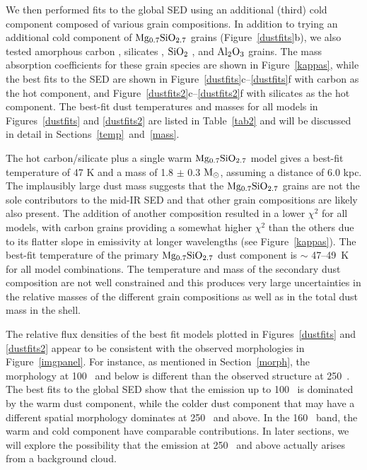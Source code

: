 \documentclass{emulateapj}
\begin{document}
We then performed fits to the global SED using an additional (third) cold component composed of various grain compositions. In addition to trying an additional cold component of $\rm Mg_{0.7}SiO_{2.7}$ grains (Figure~\ref{dustfits}b), we also tested amorphous carbon \citep{rouleau91},  silicates \citep{weingartner01}, $\rm SiO_2$ \citep{henning97}, and $\rm Al_2O_3$  \citep{begemann97} grains. The mass absorption coefficients for these grain species are shown in Figure~\ref{kappas}, while the best fits to the SED are shown in Figure~\ref{dustfits}c--\ref{dustfits}f with carbon as the hot component, and Figure~\ref{dustfits2}c--\ref{dustfits2}f with silicates as the hot component. The best-fit dust temperatures and masses for all models in Figures~\ref{dustfits} and \ref{dustfits2} are listed in Table~\ref{tab2} and will be discussed in detail in Sections~\ref{temp}~and~\ref{mass}.

The hot carbon/silicate plus a single warm $\rm Mg_{0.7}SiO_{2.7}$ model gives a best-fit temperature of 47 K and a mass of 1.8 $\pm$ 0.3 $\rm M_{\odot}$, assuming a distance of 6.0 kpc. The implausibly large dust mass suggests that the $\rm Mg_{0.7}SiO_{2.7}$ grains are not the sole contributors to the mid-IR SED and that other grain compositions are likely also present.
The addition of another composition resulted in a lower $\chi^2$ for all models, with carbon grains providing a somewhat higher $\chi^2$ than the others due to its flatter slope in emissivity at longer wavelengths (see Figure~\ref{kappas}). The best-fit temperature of the primary $\rm Mg_{0.7}SiO_{2.7}$ dust component is $\sim$ 47--49~K for all model combinations. The temperature and mass of the secondary dust composition are not well constrained and this produces very large uncertainties in the relative masses of the different grain compositions as well as in the total dust mass in the shell.


The relative flux densities of the best fit models plotted in Figures~\ref{dustfits} and \ref{dustfits2} appear to be consistent with the observed morphologies in Figure~\ref{imgpanel}. For instance, as mentioned in Section~\ref{morph}, the morphology at 100 \micron\ and below is different than the observed structure at 250~\micron. The best fits to the global SED show that the emission up to 100 \micron\ is dominated by the warm dust component, while the colder dust component that may have a different spatial morphology dominates at 250 \micron\ and above. In the 160 \micron\ band, the warm and cold component have comparable contributions. In later sections, we will explore the possibility that the emission at 250 \micron\ and above actually arises from a background cloud.
\end{document}

